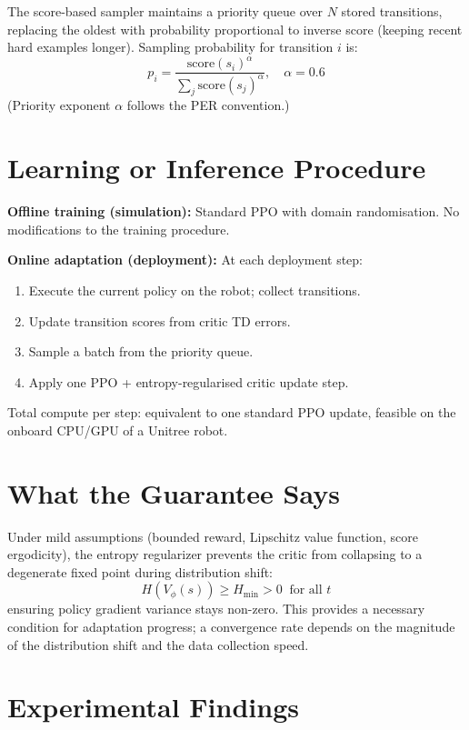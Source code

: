 \documentclass[10pt,twocolumn]{article}
\begin{document}
The score-based sampler maintains a priority queue over $N$ stored
transitions, replacing the oldest with probability proportional to
inverse score (keeping recent hard examples longer). Sampling
probability for transition $i$ is:
\[
p_i = \frac{\mathrm{score}(s_i)^\alpha}
  {\sum_j \mathrm{score}(s_j)^\alpha}, \quad \alpha = 0.6
\]
(Priority exponent $\alpha$ follows the PER convention.)

\section{Learning or Inference Procedure}

\textbf{Offline training (simulation):} Standard PPO with domain
randomisation. No modifications to the training procedure.

\textbf{Online adaptation (deployment):} At each deployment step:
\begin{enumerate}[itemsep=2pt,parsep=0pt]
  \item Execute the current policy on the robot; collect transitions.
  \item Update transition scores from critic TD errors.
  \item Sample a batch from the priority queue.
  \item Apply one PPO + entropy-regularised critic update step.
\end{enumerate}
Total compute per step: equivalent to one standard PPO update,
feasible on the onboard CPU/GPU of a Unitree robot.

\section{What the Guarantee Says}

Under mild assumptions (bounded reward, Lipschitz value function,
score ergodicity), the entropy regularizer prevents the critic from
collapsing to a degenerate fixed point during distribution shift:
\[
H(V_\phi(s)) \geq H_\mathrm{min} > 0 \;\;\text{for all } t
\]
ensuring policy gradient variance stays non-zero. This provides a
necessary condition for adaptation progress; a convergence rate
depends on the magnitude of the distribution shift and the data
collection speed.

\section{Experimental Findings}
\end{document}
